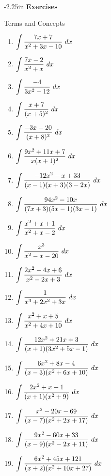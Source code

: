 \begin{adjustwidth*}{}{-2.25in}
\textbf{{\large Exercises}}
\setlength{\columnsep}{25pt}
\begin{multicols*}{2}
\noindent Terms and Concepts \small
{} 

 \small


\begin{enumerate}[1),resume]
\item $\ds \int \frac{7x+7}{x^2+3x-10}\ dx$
\item $\ds \int \frac{7x-2}{x^2+x}\ dx$
\item $\ds \int \frac{-4}{3x^2-12}\ dx$
\item $\ds \int \frac{x+7}{(x+5)^2}\ dx$
\item $\ds \int \frac{-3x-20}{(x+8)^2}\ dx$
\item $\ds \int \frac{9x^2+11x+7}{x(x+1)^2}\ dx$
\item $\displaystyle \int \frac{-12x^2-x+33}{(x-1)(x+3)(3-2x)}\ dx$
\item $\displaystyle \int \frac{94x^2-10x}{(7x+3)(5x-1)(3x-1)}\ dx$
\item $\ds \int \frac{x^2+x+1}{x^2+x-2}\ dx$
\item $\ds \int \frac{x^3}{x^2-x-20}\ dx$
\item $\ds \int \frac{2x^2-4x+6}{x^2-2x+3}\ dx$
\item $\ds \int \frac{1}{x^3+2x^2+3x}\ dx$
\item $\ds \int \frac{x^2+x+5}{x^2+4x+10}\ dx$
\item $\displaystyle \int \frac{12x^2+21x+3}{(x+1)(3x^2+5x-1)}\ dx$
\item $\displaystyle \int \frac{6x^2+8x-4}{(x-3)(x^2+6x+10)}\ dx$
\item $\displaystyle \int \frac{2x^2+x+1}{(x+1)(x^2+9)}\ dx$
\item $\displaystyle \int \frac{x^2-20x-69}{(x-7)(x^2+2x+17)}\ dx$
\item $\displaystyle \int \frac{9x^2-60x+33}{(x-9)(x^2-2x+11)}\ dx$
\item $\displaystyle \int \frac{6x^2+45x+121}{(x+2)(x^2+10x+27)}\ dx$
\end{enumerate}


\end{multicols*}
\end{adjustwidth*}
